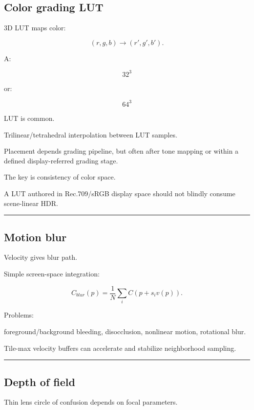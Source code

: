 \subsection{Color grading LUT}\label{04-visual-computing-ii-ch040-color-grading-lut}

3D LUT maps color:

\[
(r,g,b)
\rightarrow
(r',g',b').
\]

A:

\[
32^3
\]

or:

\[
64^3
\]

LUT is common.

Trilinear/tetrahedral interpolation between LUT samples.

Placement depends grading pipeline, but often after tone mapping or within a defined display-referred grading stage.

The key is consistency of color space.

A LUT authored in Rec.709/sRGB display space should not blindly consume scene-linear HDR.

\begin{center}\rule{0.5\linewidth}{0.5pt}\end{center}

\subsection{Motion blur}\label{04-visual-computing-ii-ch040-motion-blur}

Velocity gives blur path.

Simple screen-space integration:

\[
C_{blur}(p)
=
\frac1N
\sum_i
C(
p+s_iv(p)
).
\]

Problems:

foreground/background bleeding, disocclusion, nonlinear motion, rotational blur.

Tile-max velocity buffers can accelerate and stabilize neighborhood sampling.

\begin{center}\rule{0.5\linewidth}{0.5pt}\end{center}

\subsection{Depth of field}\label{04-visual-computing-ii-ch040-depth-of-field}

Thin lens circle of confusion depends on focal parameters.


